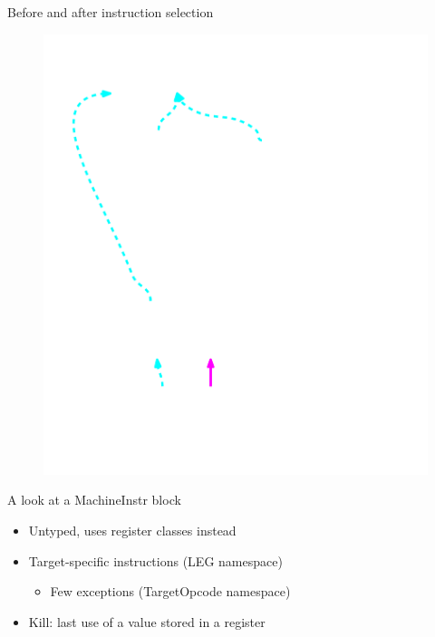 \begin{frame}{Before and after instruction selection}
\begin{minipage}[t]{0.49\linewidth}
\begin{figure}
        \includegraphics[width = 1.00\textwidth]{examples/ex1b/ex1b-post-isel.pdf}
    \end{figure}
\end{minipage}


\end{frame}


\begin{frame}{A look at a MachineInstr block}

\begin{itemize}
    \item Untyped, uses register classes instead
    \item Target-specific instructions (LEG namespace)
    \begin{itemize}
        \item Few exceptions (TargetOpcode namespace)
    \end{itemize}
\end{itemize}


\begin{itemize}
    \item Kill: last use of a value stored in a register
\end{itemize}


\end{frame}
